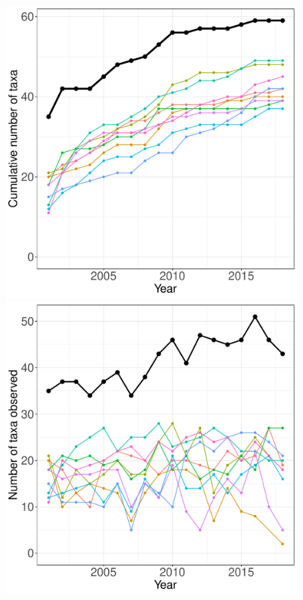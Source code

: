 \documentclass[11pt, oneside]{article}
\begin{document}
\begin{figure}[h!]
\centering
\includegraphics[scale = 0.4]{sbc-algae-castorani_species_accumulation_curve.pdf}
\includegraphics[scale = 0.4]{sbc-algae-castorani_num_taxa_over_time.pdf}

\end{figure}
\end{document}
